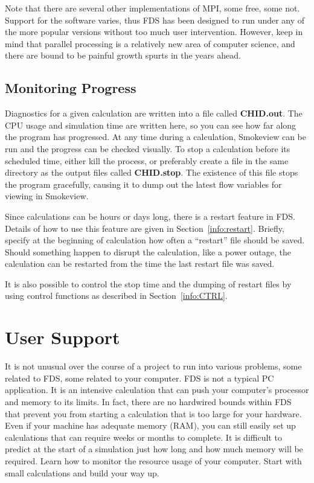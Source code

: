 \documentclass[11pt]{book}
\begin{document}
\begin{warning}
\noindent
Note that there are several other implementations of MPI, some free, some not.
Support for the software varies, thus FDS has been designed to run under any of the
more popular versions without too much user intervention. However, keep in mind
that parallel processing is a relatively new area of computer science,
and there are bound to be painful growth spurts in the years ahead.
\end{warning}


\section{Monitoring Progress}

Diagnostics for a given calculation are written into a file called {\bf CHID.out}.
The CPU usage and simulation time are written here, so you can see how
far along the program has progressed. At any time during a calculation,
Smokeview can be run and the progress can be checked visually.
To stop a calculation before its scheduled time, either
kill the process, or preferably create a file in the same directory as
the output files called {\bf CHID.stop}. The existence of this
file stops the program gracefully, causing it to dump out the
latest flow variables for viewing in Smokeview.

Since calculations can be hours or days long, there is a restart
feature in FDS. Details of how to use this feature
are given in Section~\ref{info:restart}. Briefly, specify at the
beginning of calculation how often a ``restart'' file should be saved.
Should something happen to disrupt the calculation, like a power
outage, the calculation can be restarted from the time the last restart
file was saved.

It is also possible to control the stop time and the dumping of restart files by using
control functions as described in Section~\ref{info:CTRL}.



\chapter{User Support}

It is not unusual over the course of a
project to run into various problems, some related to FDS, some related to your computer.
FDS is not a typical PC application. It is an intensive calculation that can push your computer's
processor and memory to its limits. In fact, there are no hardwired bounds within FDS that
prevent you from starting a calculation that is too large for your hardware.
Even if your machine has adequate memory (RAM), you can still easily set up calculations that can require
weeks or months to complete. It is difficult to predict at the start of a simulation just how long and
how much memory will be required. Learn how to monitor the resource usage of your computer.
Start with small calculations and build your way up.
\end{document}
